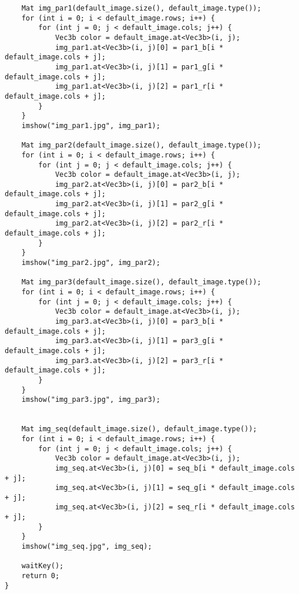 \documentclass{report}
\begin{document}
\begin{lstlisting}
	Mat img_par1(default_image.size(), default_image.type());
	for (int i = 0; i < default_image.rows; i++) {
		for (int j = 0; j < default_image.cols; j++) {
			Vec3b color = default_image.at<Vec3b>(i, j);
			img_par1.at<Vec3b>(i, j)[0] = par1_b[i * default_image.cols + j];
			img_par1.at<Vec3b>(i, j)[1] = par1_g[i * default_image.cols + j];
			img_par1.at<Vec3b>(i, j)[2] = par1_r[i * default_image.cols + j];
		}
	}
	imshow("img_par1.jpg", img_par1);

	Mat img_par2(default_image.size(), default_image.type());
	for (int i = 0; i < default_image.rows; i++) {
		for (int j = 0; j < default_image.cols; j++) {
			Vec3b color = default_image.at<Vec3b>(i, j);
			img_par2.at<Vec3b>(i, j)[0] = par2_b[i * default_image.cols + j];
			img_par2.at<Vec3b>(i, j)[1] = par2_g[i * default_image.cols + j];
			img_par2.at<Vec3b>(i, j)[2] = par2_r[i * default_image.cols + j];
		}
	}
	imshow("img_par2.jpg", img_par2);

	Mat img_par3(default_image.size(), default_image.type());
	for (int i = 0; i < default_image.rows; i++) {
		for (int j = 0; j < default_image.cols; j++) {
			Vec3b color = default_image.at<Vec3b>(i, j);
			img_par3.at<Vec3b>(i, j)[0] = par3_b[i * default_image.cols + j];
			img_par3.at<Vec3b>(i, j)[1] = par3_g[i * default_image.cols + j];
			img_par3.at<Vec3b>(i, j)[2] = par3_r[i * default_image.cols + j];
		}
	}
	imshow("img_par3.jpg", img_par3);


	Mat img_seq(default_image.size(), default_image.type());
	for (int i = 0; i < default_image.rows; i++) {
		for (int j = 0; j < default_image.cols; j++) {
			Vec3b color = default_image.at<Vec3b>(i, j);
			img_seq.at<Vec3b>(i, j)[0] = seq_b[i * default_image.cols + j];
			img_seq.at<Vec3b>(i, j)[1] = seq_g[i * default_image.cols + j];
			img_seq.at<Vec3b>(i, j)[2] = seq_r[i * default_image.cols + j];
		}
	}
	imshow("img_seq.jpg", img_seq);

	waitKey();
	return 0;
}
\end{lstlisting}
\end{document}
